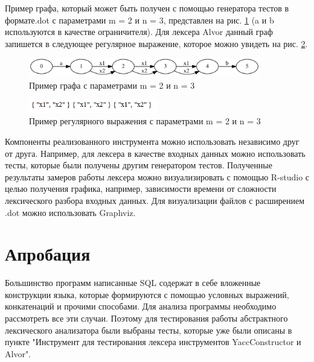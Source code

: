 \documentclass{matmex-diploma}
\begin{document}
\begin{enumerate}
Пример  графа, который может быть получен с помощью генератора тестов в формате.dot с параметрами m = 2 и n = 3, представлен на рис. \ref{fig:m2_n3} 
(a и b используются в качестве ограничителя). Для лексера Alvor данный граф запишется в следующее регулярное выражение, которое можно увидеть 
на рис. \ref{fig:m2_n3_alvor}. 
 
\begin{figure}[h!]
\begin{center}
\includegraphics[width=0.9\textwidth]{m2_n3}
\caption{Пример графа с параметрами m = 2 и n = 3}
\label{fig:m2_n3} 
\end{center}
\end{figure}

\begin{figure}[h!]
\begin{center}
\includegraphics[width=0.5\textwidth]{m2_n3_alvor}
\caption{Пример регулярного выражения с параметрами m = 2 и n = 3}
\label{fig:m2_n3_alvor} 
\end{center}
\end{figure}

Компоненты реализованного инструмента можно использовать независимо друг от друга. Например, для лексера в качестве входных данных можно использовать тесты, 
которые были получены другим генератором тестов.  Полученные результаты замеров работы лексера можно визуализировать с помощью R-studio с целью получения графика, 
например, зависимости времени от сложности лексического разбора входных данных. Для визуализации файлов с расширением .dot можно использовать Graphviz.

\end{enumerate}

\section{Апробация}
Большинство  программ написанные  SQL содержат в себе вложенные конструкции языка, которые формируются с помощью условных выражений, конкатенаций и прочими способами. 
Для анализа программы необходимо рассмотреть все эти случаи. Поэтому для тестирования работы абстрактного лексического анализатора были выбраны тесты, которые 
уже были описаны в пункте "Инструмент для тестирования лексера инструментов YaccConstructor и Alvor".
\end{document}
